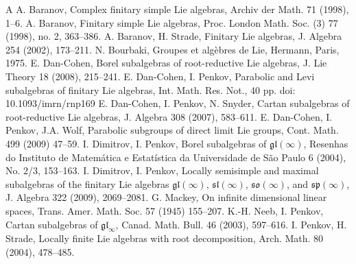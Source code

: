 \documentclass{amsart}
\theoremstyle{definition}
\theoremstyle{remark}
\numberwithin{equation}{section}
\def\gl{\mathfrak {gl}}
\def\sl{\mathfrak{sl}}
\def\so{\mathfrak{so}}
\def\sp{\mathfrak{sp}}
\begin{document}

\begin{thebibliography}{A}
 A. Baranov, Complex finitary simple Lie
algebras, Archiv der Math. 71 (1998), 1--6.
 A. Baranov, Finitary simple Lie
algebras, Proc. London Math. Soc. (3) 77 (1998), no. 2, 363--386.
 A. Baranov, H. Strade, Finitary Lie algebras, J. Algebra 254 (2002),  173--211.
 N. Bourbaki, Groupes et alg\`{e}bres de Lie, Hermann, Paris, 1975.
 E. Dan-Cohen, Borel subalgebras of root-reductive Lie algebras, J. Lie Theory 18 (2008), 215--241.
 E. Dan-Cohen, I. Penkov, Parabolic and Levi subalgebras of finitary Lie algebras, Int. Math. Res. Not., 40 pp. doi: 10.1093/imrn/rnp169
 E. Dan-Cohen, I. Penkov, N. Snyder, Cartan subalgebras of root-reductive Lie algebras, J. Algebra 308 (2007), 583--611.
 E. Dan-Cohen, I. Penkov, J.A. Wolf, Parabolic subgroups of direct limit Lie groups, Cont. Math. 499 (2009) 47--59.
 I. Dimitrov, I. Penkov, Borel subalgebras of $\gl(\infty)$, Resenhas do Instituto de Matem\'{a}tica e Estat\'{i}stica da Universidade de S\~{a}o Paulo 6 (2004), No. 2/3, 153--163.
 I. Dimitrov, I. Penkov, Locally semisimple and maximal subalgebras of the finitary Lie algebras $\gl(\infty)$, $\sl(\infty)$, $\so(\infty)$, and $\sp(\infty)$, J. Algebra 322 (2009), 2069--2081.
 G. Mackey, On infinite dimensional linear spaces, Trans. Amer. Math. Soc. 57 (1945) 155--207.
 K.-H. Neeb, I. Penkov, Cartan subalgebras of $\gl_\infty$, Canad. Math. Bull. 46 (2003), 597--616.
 I. Penkov, H. Strade, Locally finite Lie algebras with root decomposition, Arch. Math. 80 (2004), 478--485.
\end{thebibliography}
\end{document}
